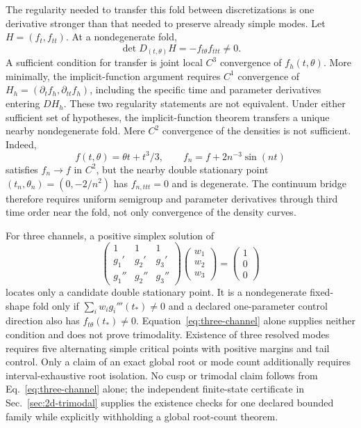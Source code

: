 \documentclass[aps,pre,reprint,amsmath,amssymb,longbibliography,floatfix]{revtex4-2}
\begin{document}
The regularity needed to transfer this fold between discretizations is one
derivative stronger than that needed to preserve already simple modes. Let
\(H=(f_t,f_{tt})\). At a nondegenerate fold,
\begin{equation}
\det D_{(t,\theta)}H
=-f_{t\theta}f_{ttt}\ne0.
\label{eq:fold-ift-determinant}
\end{equation}
A sufficient condition for transfer is joint local \(C^3\) convergence of
\(f_h(t,\theta)\). More minimally, the implicit-function argument requires
\(C^1\) convergence of \(H_h=(\partial_t f_h,\partial_{tt}f_h)\), including
the specific time and parameter derivatives entering \(D H_h\). These two
regularity statements are not equivalent. Under either sufficient set of
hypotheses, the implicit-function theorem transfers a unique nearby
nondegenerate fold. Mere \(C^2\) convergence of the densities is not
sufficient. Indeed,
\begin{equation}
f(t,\theta)=\theta t+t^3/3,
\qquad
f_n=f+2n^{-3}\sin(nt)
\label{eq:c2-fold-counterexample}
\end{equation}
satisfies \(f_n\to f\) in \(C^2\), but the nearby double stationary point
\((t_n,\theta_n)=(0,-2/n^2)\) has \(f_{n,ttt}=0\) and is degenerate. The
continuum bridge therefore requires uniform semigroup and parameter
derivatives through third time order near the fold, not only convergence of
the density curves.

For three channels, a positive simplex solution of
\begin{equation}
\begin{pmatrix}
1&1&1\\
g_1'&g_2'&g_3'\\
g_1''&g_2''&g_3''
\end{pmatrix}
\begin{pmatrix}w_1\\w_2\\w_3\end{pmatrix}
=\begin{pmatrix}1\\0\\0\end{pmatrix}
\label{eq:three-channel}
\end{equation}
locates only a candidate double stationary point.  It is a nondegenerate
fixed-shape fold only if \(\sum_iw_i g_i'''(t_*)\ne0\) and a declared
one-parameter control direction also has \(f_{t\theta}(t_*)\ne0\).
Equation~\eqref{eq:three-channel} alone supplies neither condition and does
not prove trimodality.  Existence of three resolved modes requires five
alternating simple critical points with positive margins and tail control.
Only a claim of an exact global root or mode count additionally requires
interval-exhaustive root isolation. No cusp or trimodal claim follows from
Eq.~\eqref{eq:three-channel} alone; the independent finite-state certificate
in Sec.~\ref{sec:2d-trimodal} supplies the existence checks for one declared
bounded family while explicitly withholding a global root-count theorem.
\end{document}
